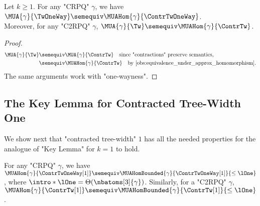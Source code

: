 \begin{fact}
	\AP\label{fact:tw-equiv-to-ctw}
	Let $k \geq 1$. For any "CRPQ" $\gamma$, we have
	$\MUA{\gamma}{\TwOneWay} \semequiv \MUAHom{\gamma}{\ContrTwOneWay}$.\\
	Moreover, for any "C2RPQ" $\gamma$,
	$\MUA{\gamma}{\Tw} \semequiv \MUAHom{\gamma}{\ContrTw}$.
\end{fact}
\begin{proof}
	\begin{align*}
		\MUA{\gamma}{\Tw}
			& \semequiv \MUA{\gamma}{\ContrTw}
			\quad\text{since "contractions" preserve semantics,} \\
			& \semequiv \MUAHom{\gamma}{\ContrTw}
			\quad\text{by \Cref{obs:equivalence_under_approx_homomorphism}.}
	\end{align*}
	The same arguments work with "one-wayness".
\end{proof}

\subsection{\AP{}The Key Lemma for Contracted Tree-Width One}
We show next that "contracted tree-width" $1$ has all the needed properties for the analogue of "Key Lemma" for $k=1$ to hold.

\begin{lemma}
    \AP\label{lemma:bound_size_refinements_tw}
    \AP For any "CRPQ" $\gamma$, we have
    $\MUAHom{\gamma}{\ContrTwOneWay[1]} \semequiv \MUAHomBounded{\gamma}{\ContrTwOneWay[1]}{\leq\lOne}$, where
    $\intro*\lOne = \Theta(\nbatoms[3]{\gamma})$.
	Similarly, for a "C2RPQ" $\gamma$,
	$\MUAHom{\gamma}{\ContrTw[1]} \semequiv
		\MUAHomBounded{\gamma}{\ContrTw[1]}{\leq\lOne}$.
\end{lemma}

